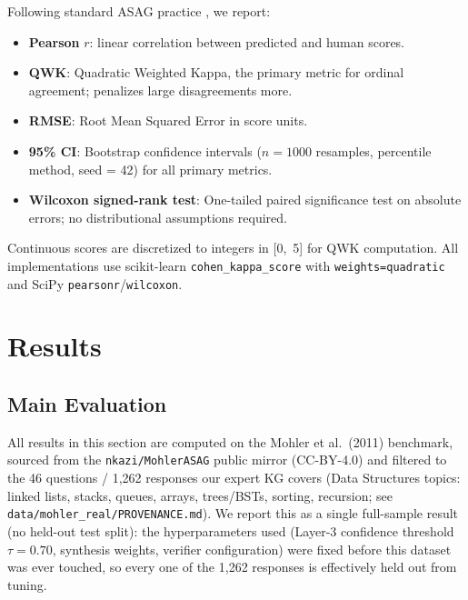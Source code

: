 \documentclass[conference]{IEEEtran}
\begin{document}
Following standard ASAG practice \cite{mohler2011,sultan2016}, we report:
\begin{itemize}
  \item \textbf{Pearson} $r$: linear correlation between predicted and human scores.
  \item \textbf{QWK}: Quadratic Weighted Kappa, the primary metric for ordinal
        agreement; penalizes large disagreements more.
  \item \textbf{RMSE}: Root Mean Squared Error in score units.
  \item \textbf{95\% CI}: Bootstrap confidence intervals ($n = 1000$ resamples,
        percentile method, seed = 42) for all primary metrics.
  \item \textbf{Wilcoxon signed-rank test}: One-tailed paired significance test
        on absolute errors; no distributional assumptions required.
\end{itemize}

Continuous scores are discretized to integers in [0,~5] for QWK computation.
All implementations use scikit-learn \texttt{cohen\_kappa\_score} with
\texttt{weights=\textquotesingle quadratic\textquotesingle} and
SciPy \texttt{pearsonr}/\texttt{wilcoxon}.

\section{Results}
\label{sec:results}

\subsection{Main Evaluation}

All results in this section are computed on the Mohler et al.\
(2011) benchmark, sourced from the \texttt{nkazi/MohlerASAG} public
mirror (CC-BY-4.0) and filtered to the 46 questions / 1{,}262
responses our expert KG covers (Data Structures topics: linked lists,
stacks, queues, arrays, trees/BSTs, sorting, recursion; see
\texttt{data/mohler\_real/PROVENANCE.md}). We report this as a single
full-sample result (no held-out test split): the hyperparameters used
(Layer-3 confidence threshold $\tau=0.70$, synthesis weights, verifier
configuration) were fixed before this dataset was ever touched, so
every one of the 1{,}262 responses is effectively held out from
tuning.
\end{document}
